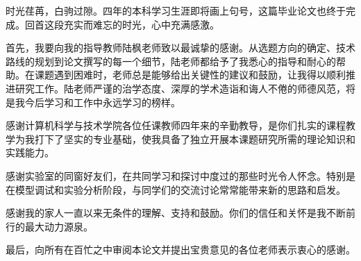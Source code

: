 \acknowledgement

时光荏苒，白驹过隙。四年的本科学习生涯即将画上句号，这篇毕业论文也终于完成。回首这段充实而难忘的时光，心中充满感激。

首先，我要向我的指导教师陆枫老师致以最诚挚的感谢。从选题方向的确定、技术路线的规划到论文撰写的每一个细节，陆老师都给予了我悉心的指导和耐心的帮助。在课题遇到困难时，老师总是能够给出关键性的建议和鼓励，让我得以顺利推进研究工作。陆老师严谨的治学态度、深厚的学术造诣和诲人不倦的师德风范，将是我今后学习和工作中永远学习的榜样。

感谢计算机科学与技术学院各位任课教师四年来的辛勤教导，是你们扎实的课程教学为我打下了坚实的专业基础，使我具备了独立开展本课题研究所需的理论知识和实践能力。

感谢实验室的同窗好友们，在共同学习和探讨中度过的那些时光令人怀念。特别是在模型调试和实验分析阶段，与同学们的交流讨论常常能带来新的思路和启发。

感谢我的家人一直以来无条件的理解、支持和鼓励。你们的信任和关怀是我不断前行的最大动力源泉。

最后，向所有在百忙之中审阅本论文并提出宝贵意见的各位老师表示衷心的感谢。

